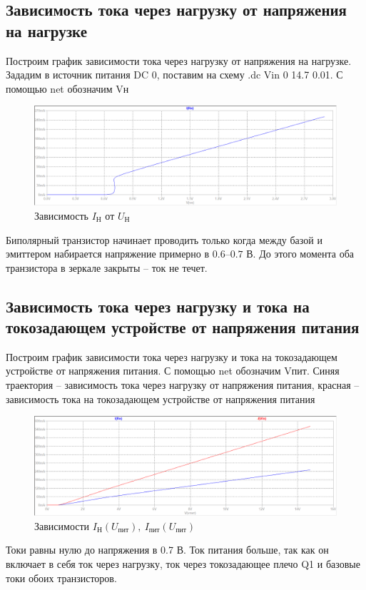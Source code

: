 \documentclass[a4paper, 12pt]{article}
\begin{document}
    \subsection{Зависимость тока через нагрузку от напряжения на нагрузке}
    Построим график зависимости тока через нагрузку от напряжения на нагрузке.
    Зададим в источник питания DC 0, поставим на схему .dc Vin 0 14.7 0.01.
    С помощью net обозначим Vн
    \begin{figure}[H]
        \centering
        \includegraphics[scale=0.46]{1task_Iн(Vн).png}
        \captionsetup{skip=0pt}
        \caption{Зависимость $I_\text{Н}$ от $U_\text{Н}$}
        \label{fig:1task_InVn}
    \end{figure}
    \noindent Биполярный транзистор начинает проводить только когда между базой
    и эмиттером набирается напряжение примерно в $0.6$--$0.7$ В. До этого момента
    оба транзистора в зеркале закрыты -- ток не течет.


    \subsection{Зависимость тока через нагрузку и тока на токозадающем устройстве от напряжения питания}
    Построим график зависимости тока через нагрузку и тока на токозадающем устройстве от напряжения питания.
    С помощью net обозначим Vпит. Синяя траектория -- зависимость тока через нагрузку от напряжения питания,
    красная -- зависимость тока на токозадающем устройстве от напряжения питания
    \begin{figure}[H]
        \centering
        \includegraphics[scale=0.46]{1task_Iн(Vпит)_Iпит(Vпит).png}
        \captionsetup{skip=0pt}
        \caption{Зависимости $I_\text{Н}\left( U_\text{пит} \right),\ I_\text{пит}\left( U_\text{пит} \right)$}
        \label{fig:1task_InVl_IlVl}
    \end{figure}
    \noindent Токи равны нулю до напряжения в 0.7 В.
    Ток питания больше, так как он включает в себя ток через нагрузку,
    ток через токозадающее плечо Q1 и базовые токи обоих транзисторов.
\end{document}
